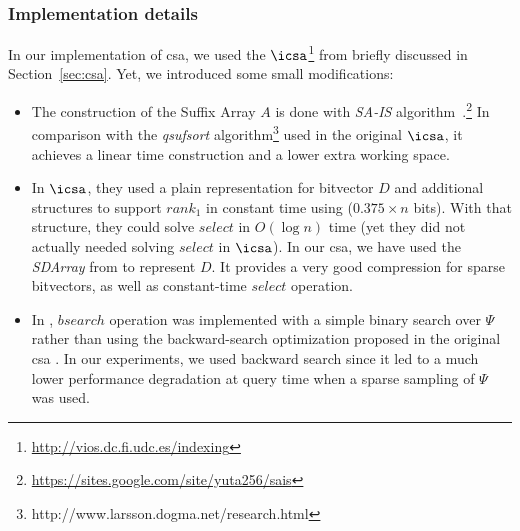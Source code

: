	\subsubsection{Implementation details} In our implementation of \gls{csa}, we used the 
	$\icsa$\footnote{\url{http://vios.dc.fi.udc.es/indexing}} from \cite{FBNCPR12} briefly discussed 
	in Section~\ref{sec:csa}. Yet, we introduced some small modifications:

	\begin{itemize}
		\item The construction of the Suffix Array $A$ is done with 
		{\em SA-IS} algorithm~\cite{nong2011two}.\footnote{\url{ https://sites.google.com/site/yuta256/sais}} 
		In comparison with the  {\em qsufsort} algorithm\footnote{
			http://www.larsson.dogma.net/research.html}
		\cite{Larsson:2007:FSS:1314704.1314853} used in the original $\icsa$, it achieves a linear time construction 
		and a lower extra working space. 
		
		\item In  $\icsa$, they used a plain representation for bitvector $D$ and additional structures to support
		$rank_1$ in constant time using ($0.375\times n$ bits). With that structure, they could solve $select$ in $O(\log n)$ time (yet 
		they did not actually needed solving $select$ in $\icsa$).
		In our \gls{csa}, we have used the {\em SDArray} from \cite{okanohara2007practical} to represent $D$. It provides a very 
		good compression for sparse bitvectors, as well as constant-time $select$ operation.
		\item In \cite{FBNCPR12}, $bsearch$ operation was implemented with a simple binary search over $\Psi$ rather than
		using the  backward-search optimization proposed in the original \gls{csa} \cite{Sad03}. In our experiments, we used
		backward search since it led to a much lower performance degradation at query time when a sparse sampling of $\Psi$ 
		was used.
		

\end{itemize}
